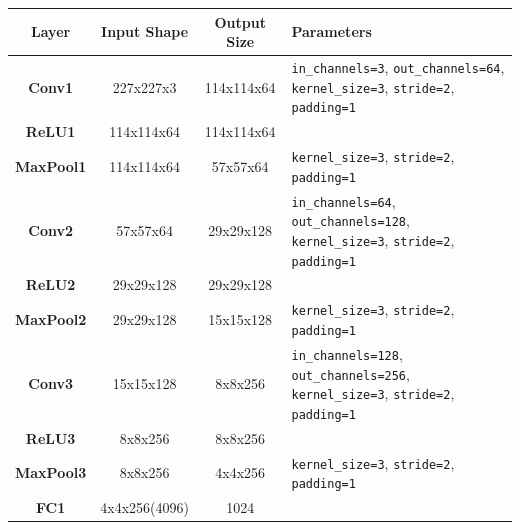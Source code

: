 \documentclass[letterpaper,11pt]{article}
\begin{document}
\begin{table}[h]
  \centering
  \begin{tabularx}{\linewidth}{|c|c|c|X|}
    \hline
    \textbf{Layer}    & \textbf{Input Shape} & \textbf{Output Size} & \textbf{Parameters}                                                                                      \\
    \hline
    \textbf{Conv1}    & 227x227x3            & 114x114x64           & \verb+in_channels=3+, \verb+out_channels=64+, \verb+kernel_size=3+, \verb+stride=2+, \verb+padding=1+    \\
    \hline
    \textbf{ReLU1}    & 114x114x64           & 114x114x64           &                                                                                                          \\
    \hline
    \textbf{MaxPool1} & 114x114x64           & 57x57x64             & \verb+kernel_size=3+, \verb+stride=2+, \verb+padding=1+                                                  \\
    \hline
    \textbf{Conv2}    & 57x57x64             & 29x29x128            & \verb+in_channels=64+, \verb+out_channels=128+, \verb+kernel_size=3+, \verb+stride=2+, \verb+padding=1+  \\
    \hline
    \textbf{ReLU2}    & 29x29x128            & 29x29x128            &                                                                                                          \\
    \hline
    \textbf{MaxPool2} & 29x29x128            & 15x15x128            & \verb+kernel_size=3+, \verb+stride=2+, \verb+padding=1+                                                  \\
    \hline
    \textbf{Conv3}    & 15x15x128            & 8x8x256              & \verb+in_channels=128+, \verb+out_channels=256+, \verb+kernel_size=3+, \verb+stride=2+, \verb+padding=1+ \\
    \hline
    \textbf{ReLU3}    & 8x8x256              & 8x8x256              &                                                                                                          \\
    \hline
    \textbf{MaxPool3} & 8x8x256              & 4x4x256              & \verb+kernel_size=3+, \verb+stride=2+, \verb+padding=1+                                                  \\
    \hline
    \textbf{FC1}      & 4x4x256(4096)        & 1024                 &                                                                                                          \\

\end{tabularx}
\end{table}
\end{document}
